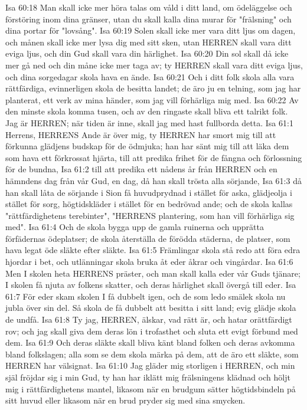 Isa 60:18  Man skall icke mer höra talas om våld i ditt land, om ödeläggelse och förstöring inom dina gränser, utan du skall kalla dina murar för "frälsning" och dina portar för "lovsång".
Isa 60:19  Solen skall icke mer vara ditt ljus om dagen, och månen skall icke mer lysa dig med sitt sken, utan HERREN skall vara ditt eviga ljus, och din Gud skall vara din härlighet.
Isa 60:20  Din sol skall då icke mer gå ned och din måne icke mer taga av; ty HERREN skall vara ditt eviga ljus, och dina sorgedagar skola hava en ände.
Isa 60:21  Och i ditt folk skola alla vara rättfärdiga, evinnerligen skola de besitta landet; de äro ju en telning, som jag har planterat, ett verk av mina händer, som jag vill förhärliga mig med.
Isa 60:22  Av den minste skola komma tusen, och av den ringaste skall bliva ett talrikt folk. Jag är HERREN; när tiden är inne, skall jag med hast fullborda detta.
Isa 61:1  Herrens, HERRENS Ande är över mig, ty HERREN har smort mig till att förkunna glädjens budskap för de ödmjuka; han har sänt mig till att läka dem som hava ett förkrossat hjärta, till att predika frihet för de fångna och förlossning för de bundna,
Isa 61:2  till att predika ett nådens år från HERREN och en hämndens dag från vår Gud, en dag, då han skall trösta alla sörjande,
Isa 61:3  då han skall låta de sörjande i Sion få huvudprydnad i stället för aska, glädjeolja i stället för sorg, högtidskläder i stället för en bedrövad ande; och de skola kallas "rättfärdighetens terebinter", "HERRENS plantering, som han vill förhärliga sig med".
Isa 61:4  Och de skola bygga upp de gamla ruinerna och upprätta förfädernas ödeplatser; de skola återställa de förödda städerna, de platser, som hava legat öde släkte efter släkte.
Isa 61:5  Främlingar skola stå redo att föra edra hjordar i bet, och utlänningar skola bruka åt eder åkrar och vingårdar.
Isa 61:6  Men I skolen heta HERRENS präster, och man skall kalla eder vår Guds tjänare; I skolen få njuta av folkens skatter, och deras härlighet skall övergå till eder.
Isa 61:7  För eder skam skolen I få dubbelt igen, och de som ledo smälek skola nu jubla över sin del. Så skola de få dubbelt att besitta i sitt land; evig glädje skola de undfå.
Isa 61:8  Ty jag, HERREN, älskar, vad rätt är, och hatar orättfärdigt rov; och jag skall giva dem deras lön i trofasthet och sluta ett evigt förbund med dem.
Isa 61:9  Och deras släkte skall bliva känt bland folken och deras avkomma bland folkslagen; alla som se dem skola märka på dem, att de äro ett släkte, som HERREN har välsignat.
Isa 61:10  Jag gläder mig storligen i HERREN, och min själ fröjdar sig i min Gud, ty han har iklätt mig frälsningens klädnad och höljt mig i rättfärdighetens mantel, likasom när en brudgum sätter högtidsbindeln på sitt huvud eller likasom när en brud pryder sig med sina smycken.
